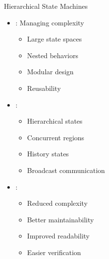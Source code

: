 \begin{frame}{Hierarchical State Machines}
\begin{itemize}
\item {}: Managing complexity
\begin{itemize}
\item Large state spaces
\item Nested behaviors
\item Modular design
\item Reusability
\end{itemize}
\vspace{0.5cm}
\item {}:
\begin{itemize}
\item Hierarchical states
\item Concurrent regions
\item History states
\item Broadcast communication
\end{itemize}
\vspace{0.3cm}
\item {}:
\begin{itemize}
\item Reduced complexity
\item Better maintainability
\item Improved readability
\item Easier verification
\end{itemize}
\end{itemize}
\end{frame}

